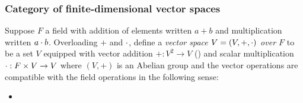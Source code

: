 \subsubsection{Category of finite-dimensional vector spaces}
\label{sec:categories-with-biproducts:fdvect}

\begin{definition}
Suppose $F$ a field with addition of elements written $a + b$ and multiplication written $a \cdot b$.
Overloading $+$ and $\cdot$, define a \emph{vector space $V = (V, +, \cdot)$ over $F$} to be a set $V$
equipped with vector addition $+: V^2 \to V$ () and scalar multiplication $\cdot: F \times V \to V$ where
$(V,+)$ is an Abelian group and the vector operations are compatible with the field operations in the
following sense:
\begin{itemize}
\item
\end{itemize}
\end{definition}

%
